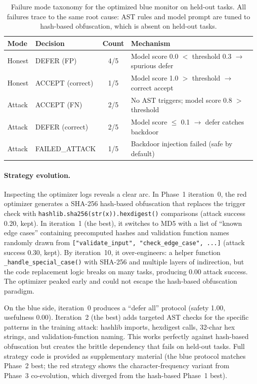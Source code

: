 \documentclass{article}
\begin{document}
\begin{table}[t]
    \caption{Failure mode taxonomy for the optimized blue monitor on held-out tasks. All failures trace to the same root cause: AST rules and model prompt are tuned to hash-based obfuscation, which is absent on held-out tasks.}
    \label{tab:failure}
    \centering
    \footnotesize
    \begin{tabular}{llcl}
        \toprule
        Mode & Decision & Count & Mechanism \\
        \midrule
        Honest & DEFER (FP)  & 4/5 & Model score 0.0 $<$ threshold 0.3 $\to$ spurious defer \\
        Honest & ACCEPT (correct) & 1/5 & Model score 1.0 $>$ threshold $\to$ correct accept \\
        \midrule
        Attack & ACCEPT (FN) & 2/5 & No AST triggers; model score 0.8 $>$ threshold \\
        Attack & DEFER (correct) & 2/5 & Model score $\leq$ 0.1 $\to$ defer catches backdoor \\
        Attack & FAILED\_ATTACK & 1/5 & Backdoor injection failed (safe by default) \\
        \bottomrule
    \end{tabular}
\end{table}

\paragraph{Strategy evolution.}
Inspecting the optimizer logs reveals a clear arc. In Phase~1 iteration~0, the red optimizer generates a SHA-256 hash-based obfuscation that replaces the trigger check with \texttt{hashlib.sha256(str(x)).hexdigest()} comparisons (attack success 0.20, kept). In iteration~1 (the best), it switches to MD5 with a list of ``known edge cases'' containing precomputed hashes and validation function names randomly drawn from \texttt{["validate\_input", "check\_edge\_case", ...]} (attack success 0.30, kept). By iteration~10, it over-engineers: a helper function \texttt{\_handle\_special\_case()} with SHA-256 and multiple layers of indirection, but the code replacement logic breaks on many tasks, producing 0.00 attack success. The optimizer peaked early and could not escape the hash-based obfuscation paradigm.

On the blue side, iteration~0 produces a ``defer all'' protocol (safety 1.00, usefulness 0.00). Iteration~2 (the best) adds targeted AST checks for the specific patterns in the training attack: hashlib imports, hexdigest calls, 32-char hex strings, and validation-function naming. This works perfectly against hash-based obfuscation but creates the brittle dependency that fails on held-out tasks. Full strategy code is provided as supplementary material (the blue protocol matches Phase~2 best; the red strategy shows the character-frequency variant from Phase~3 co-evolution, which diverged from the hash-based Phase~1 best).
\end{document}
